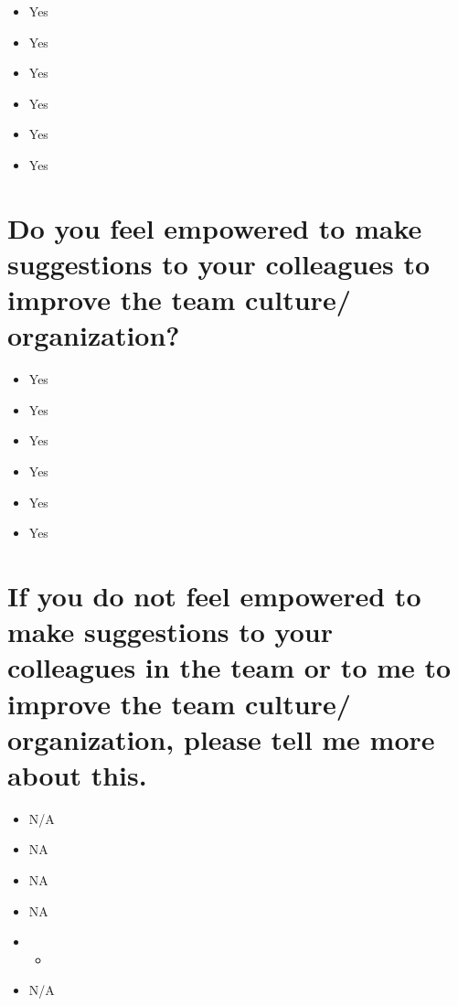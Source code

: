 \documentclass[
]{book}
\providecommand{\tightlist}{%
  \setlength{\itemsep}{0pt}\setlength{\parskip}{0pt}}
\begin{document}
\begin{itemize}
\tightlist
\item
  Yes
\item
  Yes
\item
  Yes
\item
  Yes
\item
  Yes
\item
  Yes
\end{itemize}

\hypertarget{do-you-feel-empowered-to-make-suggestions-to-your-colleagues-to-improve-the-team-culture-organization}{%
\section{Do you feel empowered to make suggestions to your colleagues to improve the team culture/ organization?}\label{do-you-feel-empowered-to-make-suggestions-to-your-colleagues-to-improve-the-team-culture-organization}}

\begin{itemize}
\tightlist
\item
  Yes
\item
  Yes
\item
  Yes
\item
  Yes
\item
  Yes
\item
  Yes
\end{itemize}

\hypertarget{if-you-do-not-feel-empowered-to-make-suggestions-to-your-colleagues-in-the-team-or-to-me-to-improve-the-team-culture-organization-please-tell-me-more-about-this.}{%
\section{If you do not feel empowered to make suggestions to your colleagues in the team or to me to improve the team culture/ organization, please tell me more about this.}\label{if-you-do-not-feel-empowered-to-make-suggestions-to-your-colleagues-in-the-team-or-to-me-to-improve-the-team-culture-organization-please-tell-me-more-about-this.}}

\begin{itemize}
\item
  N/A
\item
  NA
\item
  NA
\item
  NA
\item
  \begin{itemize}
  \tightlist
  \item
  \end{itemize}
\item
  N/A
\end{itemize}
\end{document}
